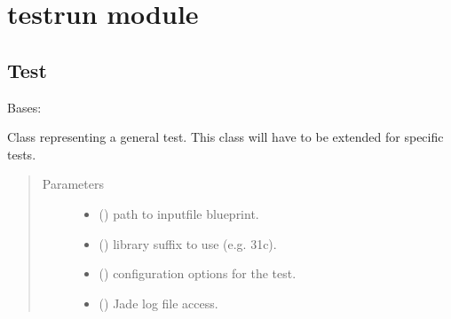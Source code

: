 \documentclass[letterpaper,10pt,english]{sphinxmanual}
\begin{document}
\section{testrun module}
\label{\detokenize{api/inputgeneration:testrun-module}}\label{\detokenize{api/inputgeneration:testrunmodule}}

\subsection{Test}
\label{\detokenize{api/inputgeneration:test}}\label{\detokenize{api/inputgeneration:testob}}

\begin{fulllineitems}
\label{\detokenize{api/inputgeneration:testrun.Test}}
\sphinxAtStartPar
Bases: 

\sphinxAtStartPar
Class representing a general test. This class will have to be extended
for specific tests.
\begin{quote}\begin{description}
\item[{Parameters}] \leavevmode\begin{itemize}
\item {} 
\sphinxAtStartPar
{} () \textendash{} path to inputfile blueprint.

\item {} 
\sphinxAtStartPar
{} () \textendash{} library suffix to use (e.g. 31c).

\item {} 
\sphinxAtStartPar
{} (\sphinxstyleliteralemphasis{\sphinxupquote{ (}}\sphinxstyleliteralemphasis{\sphinxupquote{)}}) \textendash{} configuration options for the test.

\item {} 
\sphinxAtStartPar
{} () \textendash{} Jade log file access.


\end{itemize}
\end{description}
\end{quote}
\end{fulllineitems}
\end{document}
